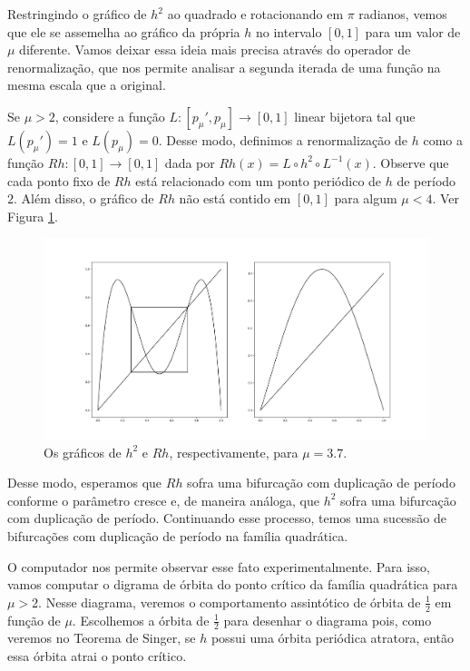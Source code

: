 Restringindo o gráfico de $h^2$ ao quadrado e rotacionando em $\pi$ radianos, vemos que ele se assemelha ao gráfico da própria $h$ no intervalo $[0, 1]$ para um valor de $\mu$ diferente. Vamos deixar essa ideia mais precisa através do operador de renormalização, que nos permite analisar a segunda iterada de uma função na mesma escala que a original.

Se $\mu > 2$, considere a função $L: [p_\mu', p_\mu] \to [0, 1]$ linear bijetora tal que $L(p_\mu') = 1$ e $L(p_\mu) = 0$.
Desse modo, definimos a renormalização de $h$ como a função $Rh: [0, 1] \to [0, 1]$ dada por $Rh(x) = L \circ h^2 \circ L^{-1}(x)$.
Observe que cada ponto fixo de $Rh$ está relacionado com um ponto periódico de $h$ de período $2$. Além disso, o gráfico de $Rh$ não está contido em $[0, 1]$ para algum $\mu < 4$. Ver Figura \ref{fig renormalization}.

\begin{figure}[!htb]
\label{fig renormalization}
\centering
\includegraphics[scale=0.25]{images/renormalization.png}
\caption{Os gráficos de $h^2$ e $Rh$, respectivamente, para $\mu = 3.7$.}
\end{figure}

Desse modo, esperamos que $Rh$ sofra uma bifurcação com duplicação de período conforme o parâmetro cresce e, de maneira análoga, que $h^2$ sofra uma bifurcação com duplicação de período. Continuando esse processo, temos uma sucessão de bifurcações com duplicação de período na família quadrática.

O computador nos permite observar esse fato experimentalmente.
Para isso, vamos computar o digrama de órbita do ponto crítico da família quadrática para $\mu > 2$.
Nesse diagrama, veremos o comportamento assintótico de órbita de $\frac{1}{2}$ em função de $\mu$.
Escolhemos a órbita de $\frac{1}{2}$ para desenhar o diagrama pois, como veremos no Teorema de Singer, se $h$ possui uma órbita periódica atratora, então essa órbita  atrai o ponto crítico.

